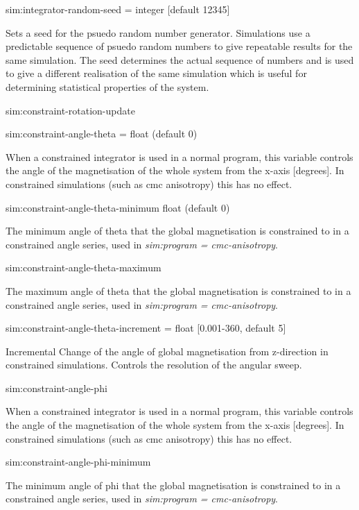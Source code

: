 {\zicf sim:integrator-random-seed = integer [default 12345]} Sets a seed for the psuedo random number generator. Simulations use a predictable sequence of psuedo random numbers to give repeatable results for the same simulation. The seed determines the actual sequence of numbers and is used to give a different realisation of the same simulation which is useful for determining statistical properties of the system.

{\zicf sim:constraint-rotation-update}

{\zicf sim:constraint-angle-theta = float (default 0)} When a constrained integrator is used in a normal program, this variable controls the angle of the magnetisation of the whole system from the x-axis [degrees]. In constrained simulations (such as cmc anisotropy) this has no effect.

{\zicf  sim:constraint-angle-theta-minimum float (default 0)}   The minimum angle of theta that the global magnetisation is constrained to in a constrained angle series, used in \textit{sim:program = cmc-anisotropy}.

{\zicf  sim:constraint-angle-theta-maximum} The maximum angle of theta that the global magnetisation is constrained to in a constrained angle series, used in \textit{sim:program = cmc-anisotropy}.

{\zicf  sim:constraint-angle-theta-increment = float [0.001-360, default 5]} Incremental Change of the angle of global magnetisation from z-direction in constrained simulations. Controls the resolution of the angular sweep.

{\zicf sim:constraint-angle-phi} When a constrained integrator is used in a normal program, this variable controls the angle of the magnetisation of the whole system from the x-axis [degrees]. In constrained simulations (such as cmc anisotropy) this has no effect.

{\zicf sim:constraint-angle-phi-minimum} The minimum angle of phi that the global magnetisation is constrained to in a constrained angle series, used in \textit{sim:program = cmc-anisotropy}.

